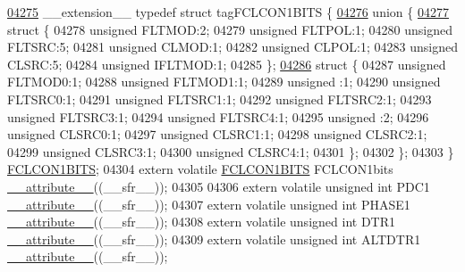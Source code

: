 \begin{DoxyCode}
\hypertarget{a00009_source_l04275}{}\hyperlink{a00008}{04275} \_\_extension\_\_ \textcolor{keyword}{typedef} \textcolor{keyword}{struct }tagFCLCON1BITS \{
\hypertarget{a00009_source_l04276}{}\hyperlink{a00009}{04276}   \textcolor{keyword}{union }\{
\hypertarget{a00009_source_l04277}{}\hyperlink{a00009}{04277}     \textcolor{keyword}{struct }\{
04278       \textcolor{keywordtype}{unsigned} FLTMOD:2;
04279       \textcolor{keywordtype}{unsigned} FLTPOL:1;
04280       \textcolor{keywordtype}{unsigned} FLTSRC:5;
04281       \textcolor{keywordtype}{unsigned} CLMOD:1;
04282       \textcolor{keywordtype}{unsigned} CLPOL:1;
04283       \textcolor{keywordtype}{unsigned} CLSRC:5;
04284       \textcolor{keywordtype}{unsigned} IFLTMOD:1;
04285     \};
\hypertarget{a00009_source_l04286}{}\hyperlink{a00009}{04286}     \textcolor{keyword}{struct }\{
04287       \textcolor{keywordtype}{unsigned} FLTMOD0:1;
04288       \textcolor{keywordtype}{unsigned} FLTMOD1:1;
04289       \textcolor{keywordtype}{unsigned} :1;
04290       \textcolor{keywordtype}{unsigned} FLTSRC0:1;
04291       \textcolor{keywordtype}{unsigned} FLTSRC1:1;
04292       \textcolor{keywordtype}{unsigned} FLTSRC2:1;
04293       \textcolor{keywordtype}{unsigned} FLTSRC3:1;
04294       \textcolor{keywordtype}{unsigned} FLTSRC4:1;
04295       \textcolor{keywordtype}{unsigned} :2;
04296       \textcolor{keywordtype}{unsigned} CLSRC0:1;
04297       \textcolor{keywordtype}{unsigned} CLSRC1:1;
04298       \textcolor{keywordtype}{unsigned} CLSRC2:1;
04299       \textcolor{keywordtype}{unsigned} CLSRC3:1;
04300       \textcolor{keywordtype}{unsigned} CLSRC4:1;
04301     \};
04302   \};
04303 \} \hyperlink{a00008_d4/da8/a00437}{FCLCON1BITS};
04304 \textcolor{keyword}{extern} \textcolor{keyword}{volatile} \hyperlink{a00008_d4/da8/a00437}{FCLCON1BITS} FCLCON1bits \hyperlink{a00009_a493c46f03454991ccc5aa7a6e1dfb2a7}{\_\_attribute\_\_}((\_\_sfr\_\_));
04305 
04306 \textcolor{keyword}{extern} \textcolor{keyword}{volatile} \textcolor{keywordtype}{unsigned} \textcolor{keywordtype}{int}  PDC1 \hyperlink{a00009_a493c46f03454991ccc5aa7a6e1dfb2a7}{\_\_attribute\_\_}((\_\_sfr\_\_));
04307 \textcolor{keyword}{extern} \textcolor{keyword}{volatile} \textcolor{keywordtype}{unsigned} \textcolor{keywordtype}{int}  PHASE1 \hyperlink{a00009_a493c46f03454991ccc5aa7a6e1dfb2a7}{\_\_attribute\_\_}((\_\_sfr\_\_));
04308 \textcolor{keyword}{extern} \textcolor{keyword}{volatile} \textcolor{keywordtype}{unsigned} \textcolor{keywordtype}{int}  DTR1 \hyperlink{a00009_a493c46f03454991ccc5aa7a6e1dfb2a7}{\_\_attribute\_\_}((\_\_sfr\_\_));
04309 \textcolor{keyword}{extern} \textcolor{keyword}{volatile} \textcolor{keywordtype}{unsigned} \textcolor{keywordtype}{int}  ALTDTR1 \hyperlink{a00009_a493c46f03454991ccc5aa7a6e1dfb2a7}{\_\_attribute\_\_}((\_\_sfr\_\_));

\end{DoxyCode}
